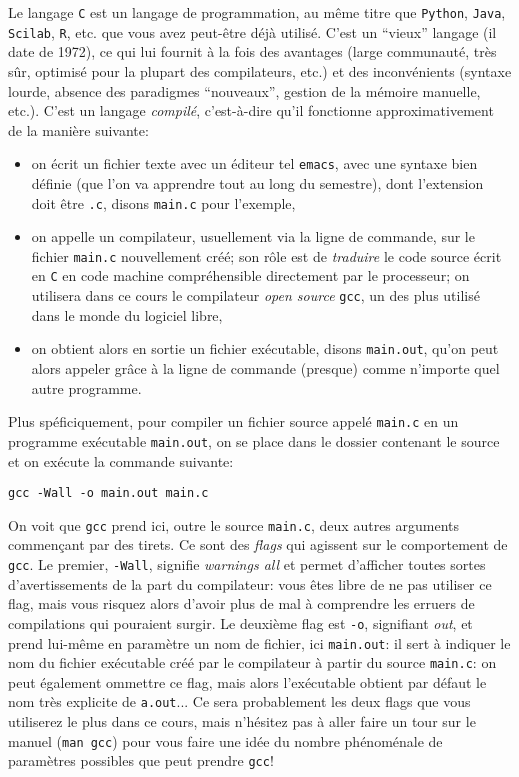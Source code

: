\documentclass[10pt,french,a4paper]{article}
\theoremstyle{definition}
\theoremstyle{remark}
\newcommand{\shell}[1]{\lstinline[style=sh]|#1|}
\begin{document}
Le langage \shell{C} est un langage de programmation, au même titre
que \shell{Python}, \shell{Java}, \shell{Scilab}, \shell{R}, etc. que
vous avez peut-être déjà utilisé. C'est un ``vieux'' langage (il date
de 1972), ce qui lui fournit à la fois des avantages (large
communauté, très sûr, optimisé pour la plupart des compilateurs, etc.)
et des inconvénients (syntaxe lourde, absence des paradigmes
``nouveaux'', gestion de la mémoire manuelle, etc.). C'est un langage
{\em compilé}, c'est-à-dire qu'il fonctionne approximativement de la
manière suivante:
\begin{itemize}
\item on écrit un fichier texte avec un éditeur tel \shell{emacs},
  avec une syntaxe bien définie (que l'on va apprendre tout au long du
  semestre), dont l'extension doit être \shell{.c}, disons
  \shell{main.c} pour l'exemple,
\item on appelle un compilateur, usuellement via la ligne de commande,
  sur le fichier \shell{main.c} nouvellement créé; son rôle est de
  {\em traduire} le code source écrit en \shell{C} en code machine
  compréhensible directement par le processeur; on utilisera dans ce
  cours le compilateur {\em open source} \shell{gcc}, un des plus
  utilisé dans le monde du logiciel libre,
\item on obtient alors en sortie un fichier exécutable, disons
  \shell{main.out}, qu'on peut alors appeler grâce à la ligne de
  commande (presque) comme n'importe quel autre programme.
\end{itemize}

Plus spéficiquement, pour compiler un fichier source appelé
\shell{main.c} en un programme exécutable \shell{main.out}, on se
place dans le dossier contenant le source et on exécute la commande
suivante:
\begin{lstlisting}[style=sh]
  gcc -Wall -o main.out main.c
\end{lstlisting}
On voit que \shell{gcc} prend ici, outre le source \shell{main.c},
deux autres arguments commençant par des tirets. Ce sont des {\em
  flags} qui agissent sur le comportement de \shell{gcc}. Le premier,
\shell{-Wall}, signifie {\em warnings all} et permet d'afficher toutes
sortes d'avertissements de la part du compilateur: vous êtes libre de
ne pas utiliser ce flag, mais vous risquez alors d'avoir plus de mal à
comprendre les erruers de compilations qui pouraient surgir. Le
deuxième flag est \shell{-o}, signifiant {\em out}, et prend lui-même
en paramètre un nom de fichier, ici \shell{main.out}: il sert à
indiquer le nom du fichier exécutable créé par le compilateur à partir
du source \shell{main.c}: on peut également ommettre ce flag, mais
alors l'exécutable obtient par défaut le nom très explicite de
\shell{a.out}... Ce sera probablement les deux flags que vous
utiliserez le plus dans ce cours, mais n'hésitez pas à aller faire un
tour sur le manuel (\shell{man gcc}) pour vous faire une idée du
nombre phénoménale de paramètres possibles que peut prendre
\shell{gcc}!
\end{document}
